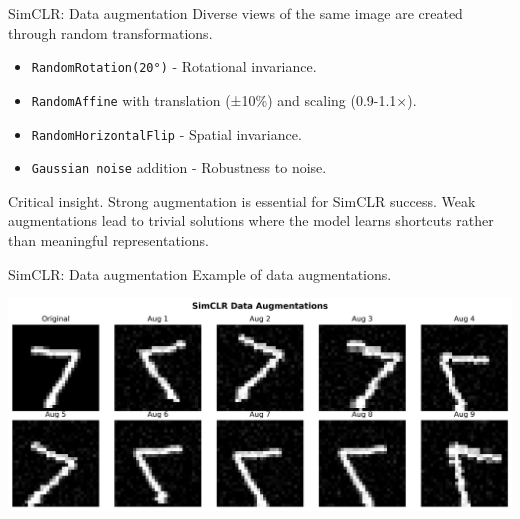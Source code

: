 \documentclass{beamer}
\begin{document}
\begin{frame}{SimCLR: Data augmentation}
  \alert{Diverse views} of the same image are created through random
  transformations.
\vspace{0.3cm}
\begin{itemize}
\item \texttt{RandomRotation(20°)} - Rotational invariance.
\vspace{0.3cm}
\item \texttt{RandomAffine} with translation (±10\%) and scaling (0.9-1.1×).
\vspace{0.3cm}
\item \texttt{RandomHorizontalFlip} - Spatial invariance.  
\vspace{0.3cm}
\item \texttt{Gaussian noise} addition - Robustness to noise.
\end{itemize}
\vspace{0.5cm}
\begin{alertblock}{Critical insight.}
Strong augmentation is \alert{essential} for SimCLR success. Weak
augmentations lead to trivial solutions where the model learns
shortcuts rather than meaningful representations.
\end{alertblock}
\end{frame}

\begin{frame}{SimCLR: Data augmentation}
  Example of data augmentations.
  \vspace{0.3cm}
  \begin{center}
    \includegraphics[scale=0.3]{./figs/simclr_augmentations.png}
  \end{center}
\end{frame}
\end{document}

